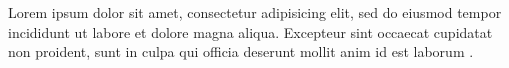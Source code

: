 \documentclass{article}
\begin{document}
      Lorem ipsum dolor sit amet, consectetur adipisicing elit, sed do eiusmod tempor incididunt ut labore et dolore magna aliqua. Excepteur sint occaecat cupidatat non proident, sunt in culpa qui officia deserunt mollit anim id est laborum \autocite{Smith1998}.
      \printbibliography
\end{document}
